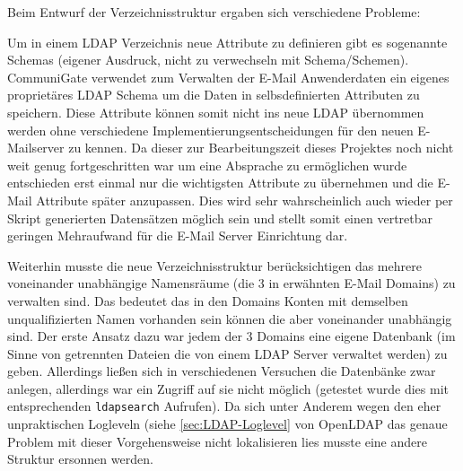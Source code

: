 \documentclass[11pt,a4paper,titlepage=firstiscover,headsepline]{scrartcl} %
\begin{document}
\medskip Beim Entwurf der Verzeichnisstruktur ergaben sich verschiedene Probleme:

\noindent Um in einem LDAP Verzeichnis neue Attribute zu definieren gibt es sogenannte Schemas (eigener Ausdruck, nicht zu verwechseln mit Schema/Schemen). CommuniGate verwendet zum Verwalten der E-Mail Anwenderdaten ein eigenes proprietäres LDAP Schema um die Daten in selbsdefinierten Attributen zu speichern. Diese Attribute können somit nicht ins neue LDAP übernommen werden ohne verschiedene Implementierungsentscheidungen für den neuen E-Mailserver zu kennen. Da dieser zur Bearbeitungszeit dieses Projektes noch nicht weit genug fortgeschritten war um eine Absprache zu ermöglichen wurde entschieden erst einmal nur die wichtigsten Attribute zu übernehmen und die E-Mail Attribute später anzupassen. Dies wird sehr wahrscheinlich auch wieder per Skript generierten Datensätzen möglich sein und stellt somit einen vertretbar geringen Mehraufwand für die E-Mail Server Einrichtung dar.

Weiterhin musste die neue Verzeichnisstruktur berücksichtigen das mehrere voneinander unabhängige Namensräume (die 3 in  erwähnten E-Mail Domains) zu verwalten sind. Das bedeutet das in den Domains Konten mit demselben unqualifizierten Namen vorhanden sein können die aber voneinander unabhängig sind. Der erste Ansatz dazu war jedem der 3 Domains eine eigene Datenbank (im Sinne von getrennten Dateien die von einem LDAP Server verwaltet werden) zu geben. Allerdings ließen sich in verschiedenen Versuchen die Datenbänke zwar anlegen, allerdings war ein Zugriff auf sie nicht möglich (getestet wurde dies mit entsprechenden \texttt{ldapsearch} Aufrufen). Da sich unter Anderem wegen den eher unpraktischen Logleveln (siehe \autoref{sec:LDAP-Loglevel} von OpenLDAP das genaue Problem mit dieser Vorgehensweise nicht lokalisieren lies musste eine andere Struktur ersonnen werden.
\end{document}
